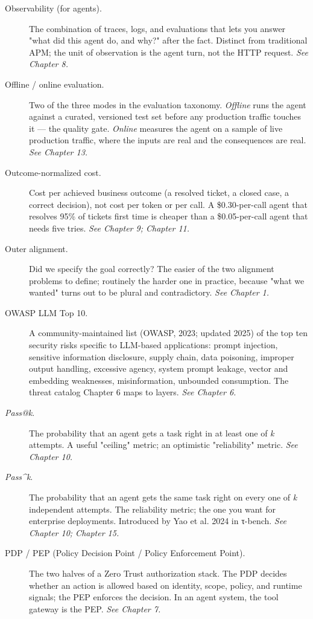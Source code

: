 \begin{description}
  \item[Observability (for agents).] The combination of traces, logs, and evaluations that lets you answer "what did this agent do, and why?" after the fact. Distinct from traditional APM; the unit of observation is the agent turn, not the HTTP request. \textit{See Chapter 8.}
  \item[Offline / online evaluation.] Two of the three modes in the evaluation taxonomy. \textit{Offline} runs the agent against a curated, versioned test set before any production traffic touches it — the quality gate. \textit{Online} measures the agent on a sample of live production traffic, where the inputs are real and the consequences are real. \textit{See Chapter 13.}
  \item[Outcome-normalized cost.] Cost per achieved business outcome (a resolved ticket, a closed case, a correct decision), not cost per token or per call. A \$0.30-per-call agent that resolves 95\% of tickets first time is cheaper than a \$0.05-per-call agent that needs five tries. \textit{See Chapter 9; Chapter 11.}
  \item[Outer alignment.] Did we specify the goal correctly? The easier of the two alignment problems to define; routinely the harder one in practice, because "what we wanted" turns out to be plural and contradictory. \textit{See Chapter 1.}
  \item[OWASP LLM Top 10.] A community-maintained list (OWASP, 2023; updated 2025) of the top ten security risks specific to LLM-based applications: prompt injection, sensitive information disclosure, supply chain, data poisoning, improper output handling, excessive agency, system prompt leakage, vector and embedding weaknesses, misinformation, unbounded consumption. The threat catalog Chapter 6 maps to layers. \textit{See Chapter 6.}
  \item[\textit{Pass@k}.] The probability that an agent gets a task right in at least one of \textit{k} attempts. A useful "ceiling" metric; an optimistic "reliability" metric. \textit{See Chapter 10.}
  \item[\textit{Pass\textasciicircum{}k}.] The probability that an agent gets the same task right on every one of \textit{k} independent attempts. The reliability metric; the one you want for enterprise deployments. Introduced by Yao et al. 2024 in τ-bench. \textit{See Chapter 10; Chapter 15.}
  \item[PDP / PEP (Policy Decision Point / Policy Enforcement Point).] The two halves of a Zero Trust authorization stack. The PDP decides whether an action is allowed based on identity, scope, policy, and runtime signals; the PEP enforces the decision. In an agent system, the tool gateway is the PEP. \textit{See Chapter 7.}

\end{description}

